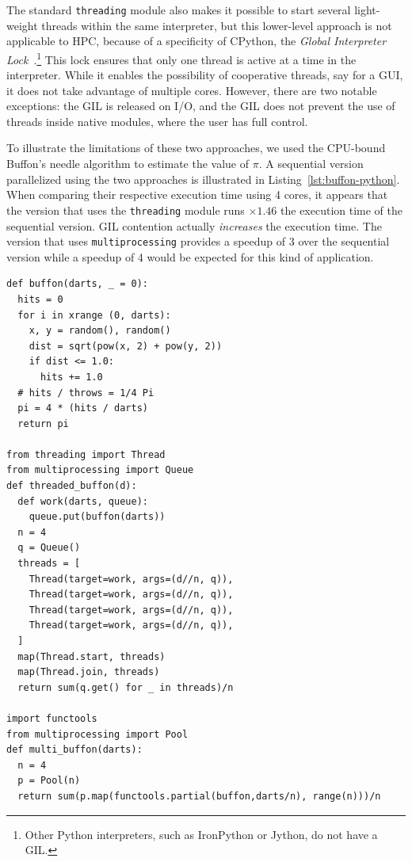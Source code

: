 \documentclass[conference]{IEEEtran}
\begin{document}
The standard \texttt{threading} module also makes it possible to start several
light-weight threads within the same interpreter, but this lower-level approach
is not applicable to HPC, because of a specificity of CPython, the \emph{Global
Interpreter Lock}~\cite{gil2012}.\footnote{Other Python interpreters, such as
IronPython or Jython, do not have a GIL.} This lock ensures that only one thread
is active at a time in the interpreter. While it enables the possibility of
cooperative threads, say for a GUI, it does not take advantage of multiple
cores. However, there are two notable exceptions: the GIL is released on I/O,
and the GIL does not prevent the use of threads inside native modules, where the
user has full control.

To illustrate the limitations of these two approaches, we used the CPU-bound
Buffon's needle algorithm to estimate the value of $\pi$. A sequential version
parallelized using the two approaches is illustrated in
Listing~\ref{lst:buffon-python}. When comparing their respective execution time
using 4 cores, it appears that the version that uses the \texttt{threading}
module runs $\times 1.46$ the execution time of the sequential version. GIL
contention actually \emph{increases} the execution time. The version that uses
\texttt{multiprocessing} provides a speedup of 3 over the sequential version
while a speedup of 4 would be expected for this kind of application.

\begin{lstlisting}[float, label={lst:buffon-python}, caption={Implementation of
sequential and parallel version of the Buffon algorithm in Python.}]
def buffon(darts, _ = 0):
  hits = 0
  for i in xrange (0, darts):
    x, y = random(), random()
    dist = sqrt(pow(x, 2) + pow(y, 2))
    if dist <= 1.0:
      hits += 1.0
  # hits / throws = 1/4 Pi
  pi = 4 * (hits / darts)
  return pi

from threading import Thread
from multiprocessing import Queue
def threaded_buffon(d):
  def work(darts, queue):
    queue.put(buffon(darts))
  n = 4
  q = Queue()
  threads = [
    Thread(target=work, args=(d//n, q)),
    Thread(target=work, args=(d//n, q)),
    Thread(target=work, args=(d//n, q)),
    Thread(target=work, args=(d//n, q)),
  ]
  map(Thread.start, threads)
  map(Thread.join, threads)
  return sum(q.get() for _ in threads)/n

import functools
from multiprocessing import Pool
def multi_buffon(darts):
  n = 4
  p = Pool(n)
  return sum(p.map(functools.partial(buffon,darts/n), range(n)))/n
\end{lstlisting}
\end{document}

